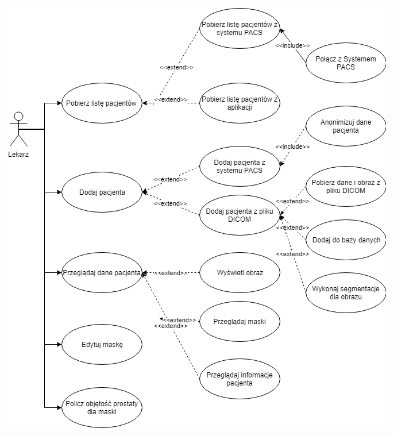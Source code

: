 \documentclass[a4paper,11pt,twoside]{report}
\theoremstyle{definition}
\begin{document}
\begin{minipage}[h]{\linewidth}
	\centering
	\includegraphics[width=0.75\textwidth]{useCase.png}
\end{minipage}
\par
\end{document}

